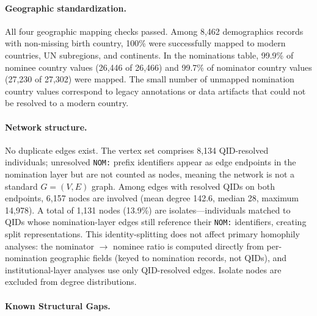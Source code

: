 \documentclass[12pt]{article}
\begin{document}
\paragraph*{Geographic standardization.} All four geographic mapping checks passed. Among 8,462 demographics records with non-missing birth country, 100\% were successfully mapped to modern countries, UN subregions, and continents. In the nominations table, 99.9\% of nominee country values (26,446 of 26,466) and 99.7\% of nominator country values (27,230 of 27,302) were mapped. The small number of unmapped nomination country values correspond to legacy annotations or data artifacts that could not be resolved to a modern country.

\paragraph*{Network structure.} No duplicate edges exist. The vertex set comprises 8,134 QID-resolved individuals; unresolved \texttt{NOM:} prefix identifiers appear as edge endpoints in the nomination layer but are not counted as nodes, meaning the network is not a standard $G = (V, E)$ graph. Among edges with resolved QIDs on both endpoints, 6,157 nodes are involved (mean degree 142.6, median 28, maximum 14,978). A total of 1,131 nodes (13.9\%) are isolates---individuals matched to QIDs whose nomination-layer edges still reference their \texttt{NOM:} identifiers, creating split representations. This identity-splitting does not affect primary homophily analyses: the nominator $\to$ nominee ratio is computed directly from per-nomination geographic fields (keyed to nomination records, not QIDs), and institutional-layer analyses use only QID-resolved edges. Isolate nodes are excluded from degree distributions.

\paragraph*{Known Structural Gaps.}
\end{document}
